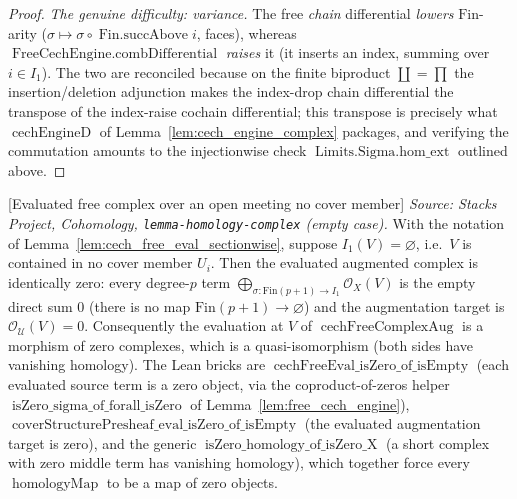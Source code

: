 \begin{proof}
  \emph{The genuine difficulty: variance.} The free \emph{chain} differential
  \emph{lowers} \(\mathrm{Fin}\)-arity (\(\sigma \mapsto \sigma \circ
  \operatorname{Fin.succAbove} i\), faces), whereas
  \(\operatorname{FreeCechEngine.combDifferential}\) \emph{raises} it (it inserts an
  index, summing over \(i \in I_1\)). The two are reconciled because on the finite
  biproduct \(\coprod = \prod\) the insertion/deletion adjunction makes the index-drop
  chain differential the transpose of the index-raise cochain differential; this
  transpose is precisely what \(\operatorname{cechEngineD}\) of
  Lemma~\ref{lem:cech_engine_complex} packages, and verifying the commutation amounts to
  the injectionwise check \(\operatorname{Limits.Sigma.hom\_ext}\) outlined above.
\end{proof}

\begin{lemma}

[Evaluated free complex over an open meeting no cover member]
  \label{lem:cech_free_eval_empty}
  \textit{Source: Stacks Project, Cohomology, \texttt{lemma-homology-complex}
  (empty case).}
  With the notation of Lemma~\ref{lem:cech_free_eval_sectionwise}, suppose
  \(I_1(V) = \varnothing\), i.e.\ \(V\) is contained in no cover member \(U_i\). Then
  the evaluated augmented complex is identically zero: every degree-\(p\) term
  \(\bigoplus_{\sigma : \mathrm{Fin}(p+1) \to I_1} \mathcal{O}_X(V)\) is the empty
  direct sum \(0\) (there is no map \(\mathrm{Fin}(p+1) \to \varnothing\)) and the
  augmentation target is \(\mathcal{O}_{\mathcal{U}}(V) = 0\). Consequently the
  evaluation at \(V\) of \(\operatorname{cechFreeComplexAug}\) is a morphism of zero
  complexes, which is a quasi-isomorphism (both sides have vanishing homology). The Lean
  bricks are \(\operatorname{cechFreeEval\_isZero\_of\_isEmpty}\) (each evaluated source
  term is a zero object, via the coproduct-of-zeros helper
  \(\operatorname{isZero\_sigma\_of\_forall\_isZero}\) of
  Lemma~\ref{lem:free_cech_engine}),
  \(\operatorname{coverStructurePresheaf\_eval\_isZero\_of\_isEmpty}\) (the evaluated
  augmentation target is zero), and the generic
  \(\operatorname{isZero\_homology\_of\_isZero\_X}\) (a short complex with zero middle
  term has vanishing homology), which together force every
  \(\operatorname{homologyMap}\) to be a map of zero objects.


\end{lemma}
